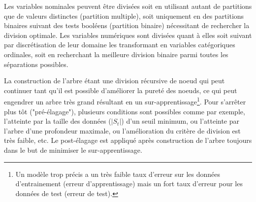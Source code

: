 Les variables nominales peuvent être divisées soit en utilisant autant de partitions que de valeurs distinctes (partition multiple), soit uniquement en des partitions binaires suivant des tests booléens (partition binaire) nécessitant de rechercher la division optimale. Les variables numériques sont divisées quant à elles soit suivant par discrétisation de leur domaine les transformant en variables catégoriques ordinales, soit en recherchant la meilleure division binaire parmi  toutes les séparations possibles. 

La construction de l'arbre étant une division récursive de noeud qui peut continuer tant qu'il est possible d'améliorer la pureté des noeuds, ce qui peut engendrer un arbre très grand résultant en un sur-apprentissage\footnote{Un modèle trop précis a un très faible taux d'erreur sur les données d'entrainement (erreur d'apprentissage) mais un fort taux d'erreur pour les données de test (erreur de test).}. Pour s'arrêter plus tôt ("pré-élagage"), plusieurs conditions sont possibles comme par exemple, l'atteinte par la taille des données ($\vert S_t \vert$) d'un seuil minimum, ou l'atteinte par l'arbre d'une profondeur maximale, ou l'amélioration du critère de division est très faible, etc. Le post-élagage est appliqué après construction de l'arbre toujours dans le but de minimiser le sur-apprentissage.





